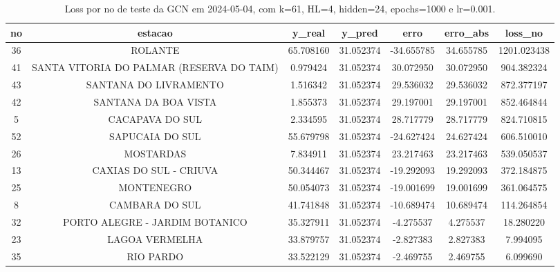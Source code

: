 \begin{table}[h]
\centering
\caption{Loss por no de teste da GCN em 2024-05-04, com k=61, HL=4, hidden=24, epochs=1000 e lr=0.001.}
\label{tab:gcn_loss_k61_hl4_h24_e1000_d20240504}
\begin{tabular}{ccccccc}
\toprule
no & estacao & y\_real & y\_pred & erro & erro\_abs & loss\_no \\
\midrule
36 & ROLANTE & 65.708160 & 31.052374 & -34.655785 & 34.655785 & 1201.023438 \\
41 & SANTA VITORIA DO PALMAR (RESERVA DO TAIM) & 0.979424 & 31.052374 & 30.072950 & 30.072950 & 904.382324 \\
43 & SANTANA DO LIVRAMENTO & 1.516342 & 31.052374 & 29.536032 & 29.536032 & 872.377197 \\
42 & SANTANA DA BOA VISTA & 1.855373 & 31.052374 & 29.197001 & 29.197001 & 852.464844 \\
5 & CACAPAVA DO SUL & 2.334595 & 31.052374 & 28.717779 & 28.717779 & 824.710815 \\
52 & SAPUCAIA DO SUL & 55.679798 & 31.052374 & -24.627424 & 24.627424 & 606.510010 \\
26 & MOSTARDAS & 7.834911 & 31.052374 & 23.217463 & 23.217463 & 539.050537 \\
13 & CAXIAS DO SUL - CRIUVA & 50.344467 & 31.052374 & -19.292093 & 19.292093 & 372.184875 \\
25 & MONTENEGRO & 50.054073 & 31.052374 & -19.001699 & 19.001699 & 361.064575 \\
8 & CAMBARA DO SUL & 41.741848 & 31.052374 & -10.689474 & 10.689474 & 114.264854 \\
32 & PORTO ALEGRE - JARDIM BOTANICO & 35.327911 & 31.052374 & -4.275537 & 4.275537 & 18.280220 \\
23 & LAGOA VERMELHA & 33.879757 & 31.052374 & -2.827383 & 2.827383 & 7.994095 \\
35 & RIO PARDO & 33.522129 & 31.052374 & -2.469755 & 2.469755 & 6.099690 \\
\bottomrule
\end{tabular}
\end{table}
